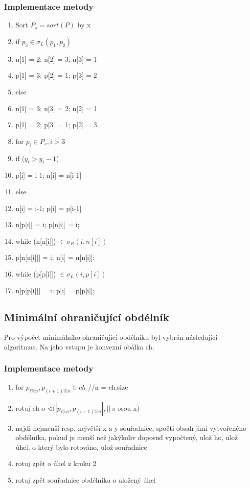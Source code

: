 \documentclass[a4paper, 12pt]{article}
\begin{document}
\subsubsection{Implementace metody}
\begin{enumerate}
	\item  Sort $P_s = sort (P)$ by x
	\item if $p_3 \in \sigma_L (p_1, p_2)$
	\item \hspace {1cm} n[1] = 2; n[2] = 3; n[3] = 1
	\item \hspace {1cm} p[1] = 3; p[2] = 1; p[3] = 2
	\item else
	\item \hspace {1cm} n[1] = 3; n[3] = 2; n[2] = 1
	\item \hspace {1cm} p[1] = 2; p[3] = 1; p[2] = 3
	\item for $p_i \in P_s, i > 3$
	\item \hspace {1cm} if ($y_i>y_i-1$) 
	\item \hspace {2cm} p[i] = i-1; n[i] = n[i-1]
	\item \hspace {1cm} else 
	\item \hspace {2cm} n[i] = i-1; p[i] = p[i-1]
	\item \hspace {1cm}n[p[i]] = i; p[n[i]] = i;
	\item \hspace {1cm}while (n[n[i]]) $\in \sigma_R (i, n[i]) $
	\item \hspace {2cm} p[n[n[i]]] = i; n[i] = n[n[i]];
	\item \hspace {1cm} while (p[p[i]]) $\in \sigma_L (i, p[i]) $
	\item \hspace {2cm} n[p[p[i]]] = i; p[i] = p[p[i]];
\end{enumerate}
\clearpage

\subsection{Minimální ohraničující obdélník}
Pro výpočet minimálního ohraničující obdélníku byl vybrán následující algoritmus. Na jeho vstupu je konvexní obálka ch.

\subsubsection{Implementace metody}
\begin{enumerate}

	\item for $p_{i\%n}, p_{(i+1)\%n} \in ch$ //n = ch.size
	\item \hspace{1cm} rotuj ch o $\sphericalangle (|p_{i\%n}, p_{(i+1)\%n}| , ||$ s osou x)
	\item \hspace{1cm} najdi nejmenší resp. největší x a y souřadnice, spočti obsah jimi vytvořeného obdélníka, pokud je menší než jakýkoliv doposud vypočtený, ulož ho, ulož úhel, o který bylo rotováno, ulož souřadnice 
	\item \hspace{1cm} rotuj zpět o úhel z kroku 2
	\item rotuj zpět souřadnice obdélníka o uložený úhel	
	
\end{enumerate}
\end{document}
